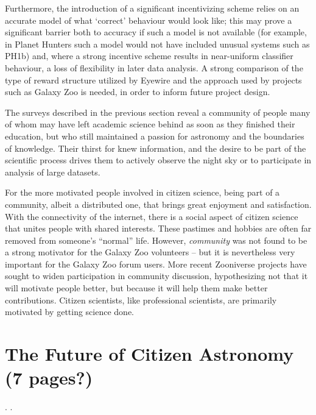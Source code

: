 \documentclass{ar2e}
\begin{document}
Furthermore, the introduction of a significant incentivizing scheme relies on an
accurate model of what `correct' behaviour would look like; this may prove a
significant barrier both to accuracy if such a model is not available (for
example, in Planet Hunters such a model would not have included unusual systems
such as PH1b) and, where a strong incentive scheme results in near-uniform
classifier behaviour, a loss of flexibility in later data analysis. 
A strong comparison of the type of reward structure utilized by Eyewire and the
approach used by projects such as Galaxy Zoo is needed, in order to
inform future project design. 

The surveys described in the previous section reveal a community of people many
of whom may have left   academic science behind as soon as they finished their 
education, but who still maintained a passion for astronomy and the  boundaries
of knowledge.  Their thirst for knew information, and the  desire to be part of
the  scientific process drives them to actively observe the  night sky or to
participate in analysis of large datasets.  

For the more motivated people involved in citizen science, being part of a
community,  albeit a distributed one, that brings great enjoyment and
satisfaction.  With the connectivity of the internet, there is a social  aspect
of citizen science that unites people with shared interests.   These pastimes
and hobbies are often far removed from someone's ``normal''  life. However, {\it
community} was not found to be a strong motivator for the Galaxy Zoo volunteers
-- but it is nevertheless very important for the Galaxy Zoo forum users. More
recent Zooniverse projects have sought to widen participation in community
discussion, hypothesizing not that it will motivate people better, but because
it will help them make better contributions. Citizen scientists, like
professional scientists, are primarily motivated by getting science done.



\section{The Future of Citizen Astronomy (7 pages?)}
\label{sec:future}

.
.
\end{document}
